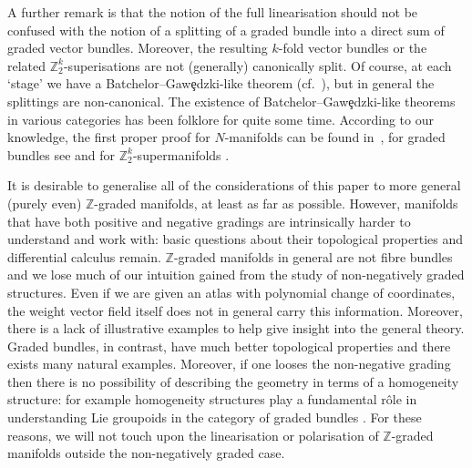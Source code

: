 \documentclass[pdftex]{sigma}
\numberwithin{equation}{section}
\begin{document}
A further remark is that the notion of the full linearisation should not be confused with the notion of a splitting of a graded bundle into a direct sum of graded vector bundles. Moreover, the resulting $k$-fold vector bundles or the related $\mathbb{Z}_{2}^{k}$-superisations are not (generally) canonically split. Of course, at each `stage' we have a Batchelor--Gaw\c{e}dzki-like theorem (cf.~\cite{Batchelor:1979,Gawedzki:1977}), but in general the splittings are non-canonical. The existence of Batchelor--Gaw\c{e}dzki-like theorems in various categories has been folklore for quite some time. According to our knowledge, the f\/irst proper proof for $N$-manifolds can be found in~\cite{Bonavolonta:2013}, for graded bundles see \cite{Bruce:2014} and for $\mathbb{Z}_{2}^{k}$-supermanifolds \cite{Covolo:2014b}.

It is desirable to generalise all of the considerations of this paper to more general (purely even) $\mathbb{Z}$-graded manifolds, at least as far as possible. However, manifolds that have both positive and negative gradings are intrinsically harder to understand and work with: basic questions about their topological properties and dif\/ferential calculus remain. $\mathbb{Z}$-graded manifolds in general are not f\/ibre bundles and we lose much of our intuition gained from the study of non-negatively graded structures. Even if we are given an atlas with polynomial change of coordinates, the weight vector f\/ield itself does not in general carry this information. Moreover, there is a lack of illustrative examples to help give insight into the general theory. Graded bundles, in contrast, have much better topological properties and there exists many natural examples. Moreover, if one looses the non-negative grading then there is no possibility of describing the geometry in terms of a homogeneity structure: for example homogeneity structures play a fundamental r\^ole in understanding Lie groupoids in the category of graded bundles \cite{Bruce:2014c}. For these reasons, we will not touch upon the linearisation or polarisation of $\mathbb{Z}$-graded manifolds outside the non-negatively graded case.
\end{document}
